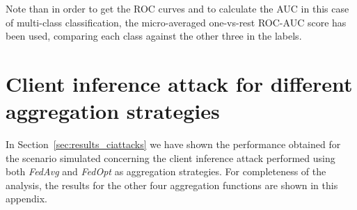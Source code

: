 \documentclass[5p,times]{elsarticle}
\begin{document}
Note than in order to get the ROC curves and to calculate the AUC in this case of multi-class classification, the micro-averaged one-vs-rest ROC-AUC score has been used, comparing each class against the other three in the labels.

\section{Client inference attack for different aggregation strategies}\label{sec:cia_results}

In Section~\ref{sec:results_ciattacks} we have shown the performance obtained for the scenario simulated concerning the client inference attack performed using both \textit{FedAvg} and \textit{FedOpt} as aggregation strategies. For completeness of the analysis, the results for the other four aggregation functions are shown in this appendix.
\end{document}
